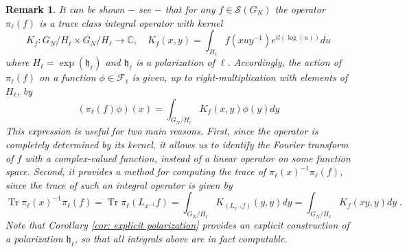 \documentclass[pdflatex,sn-mathphys-num]{sn-jnl}
\theoremstyle{thmstyletwo}
\theoremstyle{thmstyleone}
\theoremstyle{thmstyletwo}
\newtheorem{remark}[definition]{Remark}
\newcommand{\fancyh}{\mathfrak{h}}
\newcommand{\C}{\mathbb{C}}
\begin{document}
		\begin{remark}\label{rem: kernel of fourier transform}
			It can be shown $-$ see \cite[Proposition~4.2.2 in]{corwin1990representations} $-$ that for any $f \in \mathcal{S}(G_N)$ the operator $\pi_{\ell}(f)$ is a trace class integral operator with kernel
			\[K_{f}: G_N/{H_{\ell}} \times G_N/{H_{\ell}} \to \C, \quad K_f(x,y) = \int_{H_{\ell}} f(x u y^{-1})e^{il(\log(u))} du\]
			where $H_{\ell} = \exp(\fancyh_{\ell})$ and $\fancyh_{\ell}$ is a polarization of $\ell$. Accordingly, the action of $\pi_{\ell}(f)$ on a function $\phi \in \mathcal{F}_{\ell}$ is given, up to right-multiplication with elements of $H_\ell$, by
			\[(\pi_{\ell}(f)\phi)(x) = \int_{G_N/H_{\ell}}K_f(x,y)\phi(y) dy\]
			This expression is useful for two main reasons. First, since the operator is completely determined by its kernel, it allows us to identify the Fourier transform of $f$ with a complex-valued function, instead of a linear operator on some function space. Second, it provides a method for computing the trace of $\pi_{\ell}(x)^{-1}\pi_{\ell}(f)$, since the trace of such an integral operator is given by 
			\[\operatorname{Tr} \pi_{\ell}(x)^{-1}\pi_{\ell}(f) = \operatorname{Tr}\pi_{\ell}(L_{x^{-1}}f) =  \int_{G_N/H_{\ell}}K_{(L_{x^{-1}}f)}(y,y) dy =  \int_{G_N/H_{\ell}}K_f(xy,y) dy\;.\]
			Note that Corollary \ref{cor: explicit polarization} provides an explicit construction of a polarization $\fancyh_{\ell}$, so that all integrals above are in fact computable.
		\end{remark}
		
\end{document}
